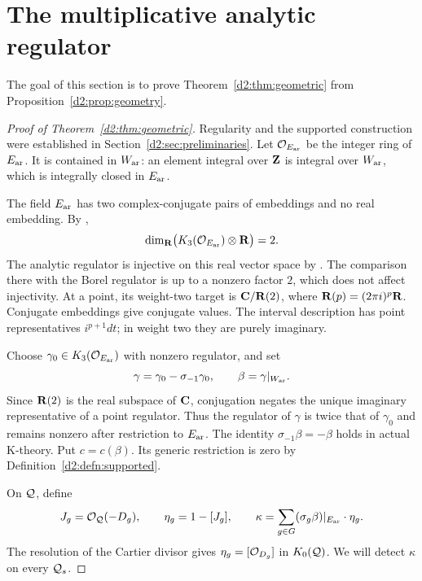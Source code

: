 \section{The multiplicative analytic regulator}\label{d2:sec:analytic}

The goal of this section is to prove Theorem~\ref{d2:thm:geometric} from
Proposition~\ref{d2:prop:geometry}.

\begin{proof}[Proof of Theorem~\ref{d2:thm:geometric}]
Regularity and the supported construction were established in
Section~\ref{d2:sec:preliminaries}.
Let \(\mathcal O_{E_{\mathrm{ar}}}\) be the integer ring of \(E_{\mathrm{ar}}\).
It is contained in \(W_{\mathrm{ar}}\): an element integral over \(\mathbf{Z}\)
is integral over \(W_{\mathrm{ar}}\), which is integrally closed in
\(E_{\mathrm{ar}}\).

The field \(E_{\mathrm{ar}}\) has two complex-conjugate pairs of embeddings
and no real embedding. By \cite[Proposition~12.2]{Borel},
\[
 \dim_{\mathbf{R}}\bigl(K_3(\mathcal O_{E_{\mathrm{ar}}})\otimes\mathbf{R}\bigr)=2.
\]
The analytic regulator is injective on this real vector space by
\cite[Section~6, especially~(6.4)]{BunkeTamme}.
The comparison there with the Borel regulator is up to a nonzero
factor \(2\), which does not affect injectivity.
At a point, its weight-two target is \(\mathbf{C}/\mathbf{R}(2)\), where
\(\mathbf{R}(p)=(2\pi i)^p\mathbf{R}\).
Conjugate embeddings give conjugate values.
The interval description has point representatives
\(i^{p+1}dt\); in weight two they are purely imaginary.

Choose \(\gamma_0\in K_3(\mathcal O_{E_{\mathrm{ar}}})\) with nonzero regulator,
and set
\[
 \gamma=\gamma_0-\sigma_{-1}\gamma_0,\qquad
 \beta=\gamma|_{W_{\mathrm{ar}}}.
\]
Since \(\mathbf{R}(2)\) is the real subspace of \(\mathbf{C}\), conjugation negates
the unique imaginary representative of a point regulator.
Thus the regulator of \(\gamma\) is twice that of \(\gamma_0\)
and remains nonzero after restriction to \(E_{\mathrm{ar}}\).
The identity \(\sigma_{-1}\beta=-\beta\) holds in actual K-theory.
Put \(c=c(\beta)\).
Its generic restriction is zero by Definition~\ref{d2:defn:supported}.

On \(\mathcal Q\), define
\[
 J_g=\mathcal O_{\mathcal Q}(-D_g),\qquad
 \eta_g=1-[J_g],\qquad
 \kappa=\sum_{g\in G}(\sigma_g\beta)|_{E_{\mathrm{ar}}}\cdot\eta_g.
\]
The resolution of the Cartier divisor gives
\(\eta_g=[\mathcal O_{D_g}]\) in \(K_0(\mathcal Q)\).
We will detect \(\kappa\) on every \(\mathcal Q_s\).


\end{proof}
